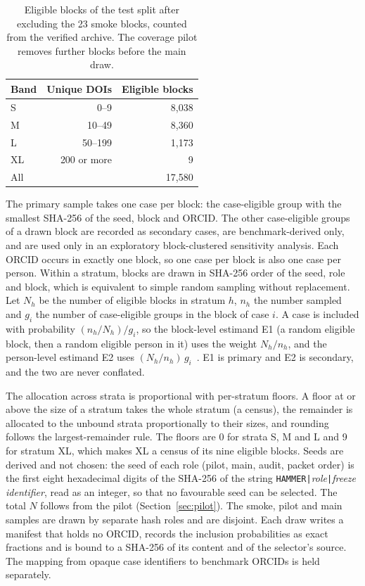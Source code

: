 \begin{table}[t]
\caption{Eligible blocks of the test split after excluding the 23 smoke blocks, counted from the verified archive. The coverage pilot removes further blocks before the main draw.}
\label{tab:frame}
\centering
\footnotesize
\renewcommand{\arraystretch}{1.1}
\begin{tabular}{@{}lrr@{}}
\toprule
\textbf{Band} & \textbf{Unique DOIs} & \textbf{Eligible blocks} \\
\midrule
S & 0--9 & 8,038 \\
M & 10--49 & 8,360 \\
L & 50--199 & 1,173 \\
XL & 200 or more & 9 \\
\midrule
All & & 17,580 \\
\bottomrule
\end{tabular}
\end{table}

The primary sample takes one case per block: the case-eligible group with the smallest SHA-256 of the seed, block and ORCID. The other case-eligible groups of a drawn block are recorded as secondary cases, are benchmark-derived only, and are used only in an exploratory block-clustered sensitivity analysis. Each ORCID occurs in exactly one block, so one case per block is also one case per person. Within a stratum, blocks are drawn in SHA-256 order of the seed, role and block, which is equivalent to simple random sampling without replacement. Let $N_h$ be the number of eligible blocks in stratum $h$, $n_h$ the number sampled and $g_i$ the number of case-eligible groups in the block of case $i$. A case is included with probability $(n_h/N_h)/g_i$, so the block-level estimand E1 (a random eligible block, then a random eligible person in it) uses the weight $N_h/n_h$, and the person-level estimand E2 uses $(N_h/n_h)\,g_i$~\cite{horvitz1952}. E1 is primary and E2 is secondary, and the two are never conflated.

The allocation across strata is proportional with per-stratum floors. A floor at or above the size of a stratum takes the whole stratum (a census), the remainder is allocated to the unbound strata proportionally to their sizes, and rounding follows the largest-remainder rule. The floors are 0 for strata S, M and L and 9 for stratum XL, which makes XL a census of its nine eligible blocks. Seeds are derived and not chosen: the seed of each role (pilot, main, audit, packet order) is the first eight hexadecimal digits of the SHA-256 of the string \texttt{HAMMER|}\textit{role}\texttt{|}\textit{freeze identifier}, read as an integer, so that no favourable seed can be selected. The total $N$ follows from the pilot (Section~\ref{sec:pilot}). The smoke, pilot and main samples are drawn by separate hash roles and are disjoint. Each draw writes a manifest that holds no ORCID, records the inclusion probabilities as exact fractions and is bound to a SHA-256 of its content and of the selector's source. The mapping from opaque case identifiers to benchmark ORCIDs is held separately.


